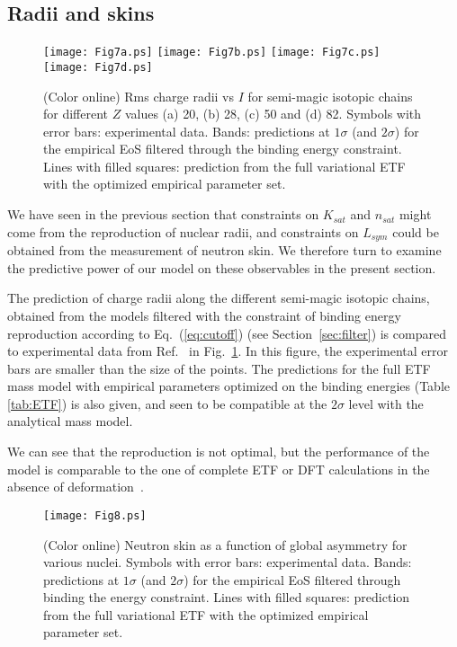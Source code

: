 \documentclass
[aps,prc,twocolumn,showpacs,showkeys,amsmath,floatfix,superscriptaddress]{revtex4}
\begin{document}
{{\subsection{Radii and skins} \label{sec:radii}

\begin{figure}[htbp]
    \begin{center}
\texttt{[image: Fig7a.ps]}
\texttt{[image: Fig7b.ps]}
\texttt{[image: Fig7c.ps]}
\texttt{[image: Fig7d.ps]}
      \caption{(Color online) Rms charge radii vs $I$ for semi-magic isotopic chains for different $Z$ values (a) 20, (b) 28, (c) 50 and (d) 82. Symbols with error bars: experimental data. 
      Bands: predictions at $1\sigma$ (and $2\sigma$) for the empirical EoS filtered through the binding energy constraint. 
      Lines with filled squares: prediction from the full variational ETF with the optimized empirical parameter set.   
      }\label{fig:aarmsch_z50_empopt_cfinsig}
      \end{center}
\end{figure}


We have seen in the previous section that constraints on $K_{sat}$ and $n_{sat}$ might come from the reproduction of nuclear radii, and constraints on $L_{sym}$ could be obtained from the measurement of neutron skin. 
We therefore turn to examine the predictive power of our model on these observables in the present section. 

The prediction of charge radii along the different semi-magic isotopic chains, obtained from the  models filtered with the constraint of   binding energy reproduction according 
to Eq.~(\ref{eq:cutoff}) (see Section~\ref{sec:filter}) is compared to experimental data from Ref.~\cite{Marinova} in Fig.~\ref{fig:aarmsch_z50_empopt_cfinsig}. 
 In this figure, the experimental error bars are smaller than the size of the points.
The predictions for the full ETF mass model with  empirical parameters optimized on the binding energies (Table \ref{tab:ETF}) is also given, and seen to be compatible 
at the $2\sigma$ level with the analytical mass model.
 
We can see that the reproduction is not optimal, but the performance of the model is comparable to the one of complete   ETF or DFT calculations 
in the absence of deformation~\cite{Buchinger,Patyk}.

\begin{figure}[htbp]
    \begin{center}
\texttt{[image: Fig8.ps]}
      \caption{(Color online) Neutron skin as a function of global asymmetry for various nuclei. 
      Symbols with error bars: experimental data. 
      Bands: predictions at $1\sigma$ (and $2\sigma$) for the empirical EoS filtered through binding the energy constraint.
      Lines with filled squares: prediction from the full 
      variational ETF with the optimized empirical parameter set.     
      }\label{fig:gasymskin_fit}
      \end{center}
\end{figure}

}}
\end{document}
